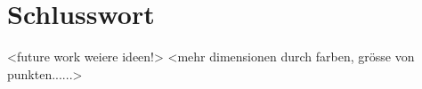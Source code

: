 \chapter{Schlusswort}

<future work weiere ideen!>
<mehr dimensionen durch farben, grösse von punkten......>